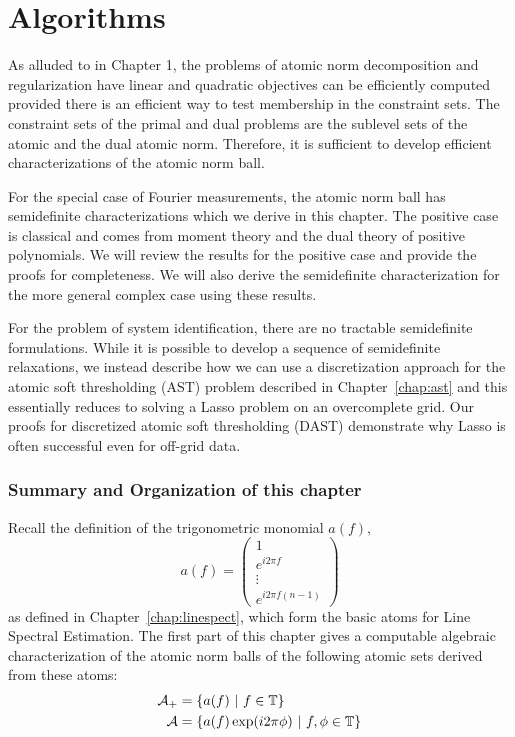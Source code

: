 \chapter{Algorithms}
\label{chap:algos}

As alluded to in Chapter 1, the problems of atomic norm decomposition and
regularization have linear and quadratic objectives can be efficiently computed
provided there is an efficient way to test membership in the constraint sets.
The constraint sets of the primal and dual problems are the sublevel sets of the
atomic and the dual atomic norm. Therefore, it is sufficient to develop
efficient characterizations of the atomic norm ball.

For the special case of Fourier measurements, the atomic norm ball has
semidefinite characterizations which we derive in this chapter. The positive
case is classical and comes from moment theory and the dual theory of positive
polynomials. We will review the results for the positive case and provide the
proofs for completeness. We will also derive the semidefinite characterization
for the more general complex case using these results.

For the problem of system identification, there are no tractable semidefinite
formulations. While it is possible to develop a sequence of semidefinite
relaxations, we instead describe how we can use a discretization approach for
the atomic soft thresholding (AST) problem described in Chapter~\ref{chap:ast}
and this essentially reduces to solving a Lasso problem on an overcomplete grid.
Our proofs for discretized atomic soft thresholding (DAST) demonstrate why Lasso
is often successful even for off-grid data.


\subsection*{Summary and Organization of this chapter} %
\label{sub:main_results}

Recall the definition of the trigonometric monomial $a(f),$ 
{\footnotesize
\[
a(f) = \begin{pmatrix}
	1\\
	e^{i 2\pi f}\\
	\vdots\\
	e^{i2\pi f (n-1)}
\end{pmatrix}
\]
}
as defined in Chapter~\ref{chap:linespect}, which form the basic atoms for Line
Spectral Estimation. The first part of this chapter gives a computable algebraic characterization of the atomic norm balls of the following atomic sets derived from these atoms:
\begin{align}
\mathcal{A}_+ &= \left\{ a(f) ~\middle|~ f \in \mathbb{T} \right\}\\
\mathcal{A}   &= \left\{ a(f) \exp(i 2\pi \phi) ~\middle|~ f, \phi \in \mathbb{T} \right\}
\end{align}

